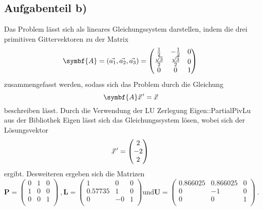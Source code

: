 \subsection*{Aufgabenteil b)}
Das Problem lässt sich als lineares Gleichungssystem darstellen, indem die drei primitiven Gittervektoren zu
der Matrix
\begin{equation}
  \symbf{A}=(\vec{a_1},\vec{a_2},\vec{a_3})=
  \begin{pmatrix}
    \frac{1}{2} & -\frac{1}{2} & 0 \\
    \frac{\sqrt{3}}{2} & \frac{\sqrt{3}}{2} & 0 \\
    0 & 0 & 1 \\
  \end{pmatrix} \\
\end{equation}
zusammengefasst werden, sodass sich das Problem durch die Gleichung
\begin{equation}
  \symbf{A}\pvec{x}'=\vec{x}
\end{equation}
beschreiben lässt. Durch die Verwendung der LU Zerlegung Eigen::PartialPivLu aus der Bibliothek Eigen lässt sich das Gleichungssystem lösen, wobei sich der Lösungsvektor
\begin{equation*}
  \pvec{x}'=
  \begin{pmatrix}
    2 \\
    -2 \\
    2 \\
  \end{pmatrix} \\
\end{equation*}
ergibt. Desweiteren ergeben sich die Matrizen
\begin{equation*}
  \symbf{P}=
  \begin{pmatrix}
    0 & 1 & 0 \\
    1 & 0 & 0 \\
    0 & 0 & 1 \\
  \end{pmatrix} \: ,
  \symbf{L}=
  \begin{pmatrix}
    1 & 0 & 0 \\
    0.57735 & 1 & 0 \\
    0 & -0 & 1 \\
  \end{pmatrix}
  \text{und}
  \symbf{U}=
  \begin{pmatrix}
    0.866025 & 0.866025 & 0 \\
    0 & -1 & 0 \\
    0 & 0 & 1 \\
  \end{pmatrix} \: .
\end{equation*}

